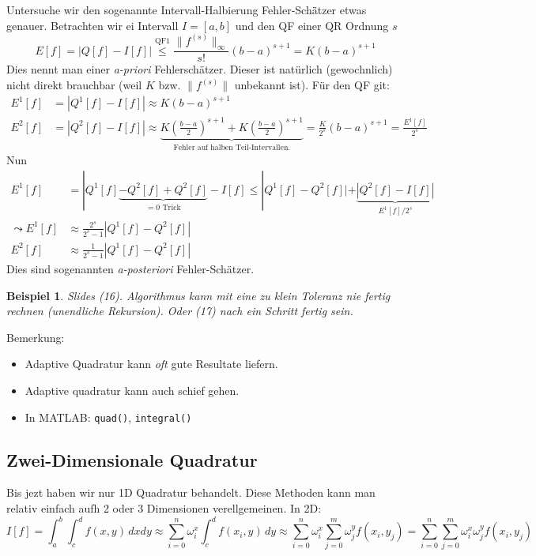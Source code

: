\documentclass[a4paper]{article}
\newtheorem{bsp}{Beispiel}
\newcommand*{\code}[1]{\texttt{#1}}
\begin{document}
Untersuche wir den sogenannte Intervall-Halbierung Fehler-Sch\"ätzer etwas
genauer. Betrachten wir ei Intervall $I = [a,b]$ und den QF einer QR Ordnung
$s$
\[
  E[f] = | Q[f] - I[f] | \stackrel{\text{QF1}}{\leq}
  \frac{\|f^{(s)}\|_\infty}{s!} (b-a)^{s+1}
  = K (b-a)^{s+1}
\]
Dies nennt man einer \emph{a-priori} Fehlersch\"atzer. Dieser ist nat\"urlich
(gewochnlich) nicht direkt brauchbar (weil $K$ bzw. $\| f^{(s)} \|$ unbekannt
ist). F\"ur den QF git:
\begin{align*}
  E^1[f] &= | Q^1[f] - I[f] | \approx K(b-a)^{s+1} \\
  E^2[f] &= | Q^2[f] - I[f] |
    \approx \underbrace{
      K \left(\frac{b-a}{2}\right)^{s+1}
      + K \left(\frac{b-a}{2}\right)^{s+1}
    }_{\text{Fehler auf halben Teil-Intervallen.}}
    = \frac{K}{2^s} (b-a)^{s+1} = \frac{E^1[f]}{2^s}
\end{align*}
Nun
\begin{align*}
  E^1[f] &= |Q^1[f] \underbrace{- Q^2[f] + Q^2[f]}_{= 0 \text{ Trick}} - I[f]
    \leq |Q^1[f] - Q^2[f]| + \underbrace{|Q^2[f] - I[f]|}_{E^1[f] / 2^s} \\
  \leadsto E^1[f] &\approx \frac{2^s}{2^s-1} | Q^1[f] - Q^2[f] | \\
  E^2[f] &\approx \frac{1}{2^s-1} |Q^1[f] - Q^2[f] | 
\end{align*}
Dies sind sogenannten \emph{a-posteriori} Fehler-Sch\"atzer.

\begin{bsp}
  Slides (16). Algorithmus kann mit eine zu klein Toleranz nie fertig rechnen
  (unendliche Rekursion). Oder (17) nach ein Schritt fertig sein.
\end{bsp}

Bemerkung:
\begin{itemize}
  \item Adaptive Quadratur kann \emph{oft} gute Resultate liefern.
  \item Adaptive quadratur kann auch schief gehen.
  \item In MATLAB: \code{quad()}, \code{integral()}
\end{itemize}

\subsection{Zwei-Dimensionale Quadratur}


Bis jezt haben wir nur 1D Quadratur behandelt. Diese Methoden kann man relativ
einfach aufh 2 oder 3 Dimensionen verellgemeinen. In 2D:
\[
  I[f] = \int_a^b \int_c^d f(x,y) \, dxdy
    \approx \sum_{i=0}^n \omega_i^x \int_c^d f(x_i, y) \, dy
    \approx \sum_{i=0}^n \omega_i^x \sum_{j=0}^m \omega_j^y f(x_i, y_j)
    = \sum_{i=0}^n \sum_{j=0}^m \omega_i^x \omega_j^y f(x_i, y_j)
\]
\end{document}
